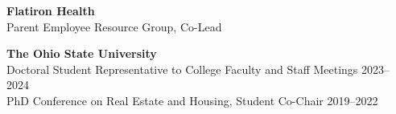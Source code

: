 \textbf{Flatiron Health} \\
Parent Employee Resource Group, Co-Lead \hfill {}

\bigskip
\textbf{The Ohio State University} \\
Doctoral Student Representative to College Faculty and Staff Meetings \hfill 2023--2024 \\
PhD Conference on Real Estate and Housing, Student Co-Chair \hfill 2019--2022